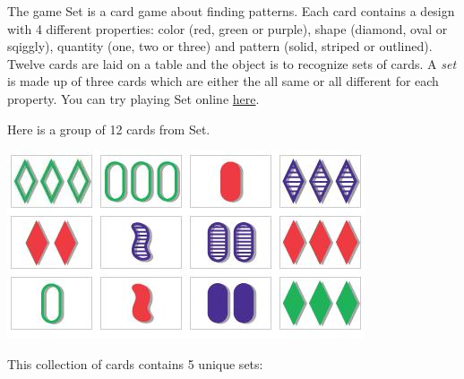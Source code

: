 \begin{problem}
The game Set is a card game about finding patterns. Each card contains a design with 4 different properties: color (red, green or purple), shape (diamond, oval or sqiggly), quantity (one, two or three) and pattern (solid, striped or outlined). Twelve cards are laid on a table and the object is to recognize sets of cards. A \emph{set} is made up of three cards which are either the all same or all different for each property. You can try playing Set online \href{http://smart-games.org/en/set/start}{here}.

Here is a group of 12 cards from Set.

\vspace{5mm}

\includegraphics{figures/set_game.jpg}

\vspace{5mm}

This collection of cards contains 5 unique sets:
\vspace{5mm}


\end{problem}
